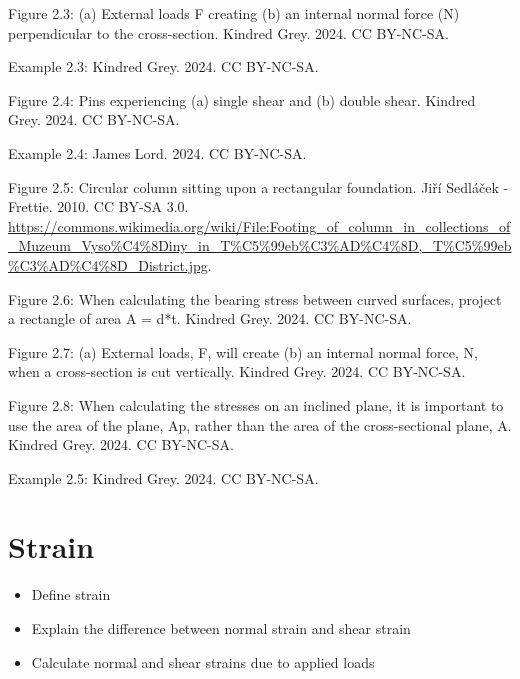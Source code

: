 \documentclass[
  letterpaper,
  DIV=11,
  numbers=noendperiod]{scrreprt}
\providecommand{\tightlist}{%
  \setlength{\itemsep}{0pt}\setlength{\parskip}{0pt}}\usepackage{longtable,booktabs,array}
\theoremstyle{definition}
\theoremstyle{remark}
\begin{document}
Figure 2.3: (a) External loads F creating (b) an internal normal force
(N) perpendicular to the cross-section. Kindred Grey. 2024. CC BY-NC-SA.

Example 2.3: Kindred Grey. 2024. CC BY-NC-SA.

Figure 2.4: Pins experiencing (a) single shear and (b) double shear.
Kindred Grey. 2024. CC BY-NC-SA.

Example 2.4: James Lord. 2024. CC BY-NC-SA.

Figure 2.5: Circular column sitting upon a rectangular foundation. Jiří
Sedláček - Frettie. 2010. CC BY-SA 3.0.
\url{https://commons.wikimedia.org/wiki/File:Footing_of_column_in_collections_of_Muzeum_Vyso\%C4\%8Diny_in_T\%C5\%99eb\%C3\%AD\%C4\%8D,_T\%C5\%99eb\%C3\%AD\%C4\%8D_District.jpg}.

Figure 2.6: When calculating the bearing stress between curved surfaces,
project a rectangle of area A = d*t. Kindred Grey. 2024. CC BY-NC-SA.

Figure 2.7: (a) External loads, F, will create (b) an internal normal
force, N, when a cross-section is cut vertically. Kindred Grey. 2024. CC
BY-NC-SA.

Figure 2.8: When calculating the stresses on an inclined plane, it is
important to use the area of the plane, Ap, rather than the area of the
cross-sectional plane, A. Kindred Grey. 2024. CC BY-NC-SA.

Example 2.5: Kindred Grey. 2024. CC BY-NC-SA.


\chapter{Strain}\label{sec-strain}

\begin{tcolorbox}[enhanced jigsaw, leftrule=.75mm, bottomrule=.15mm, opacityback=0, opacitybacktitle=0.6, colframe=quarto-callout-note-color-frame, toprule=.15mm, colbacktitle=quarto-callout-note-color!10!white, coltitle=black, bottomtitle=1mm, title={Learning Objectives}, titlerule=0mm, toptitle=1mm, colback=white, rightrule=.15mm, left=2mm, arc=.35mm, breakable]

\begin{itemize}
\tightlist
\item
  Define strain
\item
  Explain the difference between normal strain and shear strain
\item
  Calculate normal and shear strains due to applied loads
\end{itemize}

\end{tcolorbox}
\end{document}
